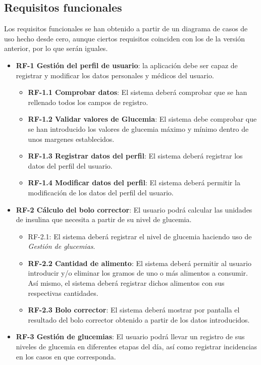 \subsection{Requisitos funcionales}
Los requisitos funcionales se han obtenido a partir de un diagrama de casos de uso hecho desde cero, aunque ciertos requisitos coinciden con los de la versión anterior, por lo que serán iguales.
\begin{itemize}
	\item \textbf{RF-1 Gestión del perfil de usuario}: la aplicación debe ser capaz de registrar y modificar los datos personales y médicos del usuario.
		\begin{itemize}
			\item \textbf{RF-1.1 Comprobar datos}: El sistema deberá comprobar que se han rellenado todos los campos de registro.
			\item \textbf{RF-1.2 Validar valores de Glucemia}: El sistema debe comprobar que se han introducido los valores de glucemia máximo y mínimo dentro de unos margenes establecidos.
			\item \textbf{RF-1.3 Registrar datos del perfil}: El sistema deberá registrar los datos del perfil del usuario.
			\item \textbf{RF-1.4 Modificar datos del perfil}: El sistema deberá permitir la modificación de los datos del perfil del usuario.
		\end{itemize}
	\item \textbf{RF-2 Cálculo del bolo corrector}: El usuario podrá calcular las unidades de insulina que necesita a partir de su nivel de glucemia.
		\begin{itemize}
			\item RF-2.1: El sistema deberá registrar el nivel de glucemia haciendo uso de \textit{Gestión de glucemias}.
			\item \textbf{RF-2.2 Cantidad de alimento}: El sistema deberá permitir al usuario introducir y/o eliminar los gramos de uno o más alimentos a consumir. Así mismo, el sistema deberá registrar dichos alimentos con sus respectivas cantidades.
			\item \textbf{RF-2.3 Bolo corrector}: El sistema deberá mostrar por pantalla el resultado del bolo corrector obtenido a partir de los datos introducidos.
		\end{itemize}
	\item \textbf{RF-3 Gestión de glucemias}: El usuario podrá llevar un registro de sus niveles de glucemia en diferentes etapas del día, así como registrar incidencias en los casos en que corresponda.

\end{itemize}

